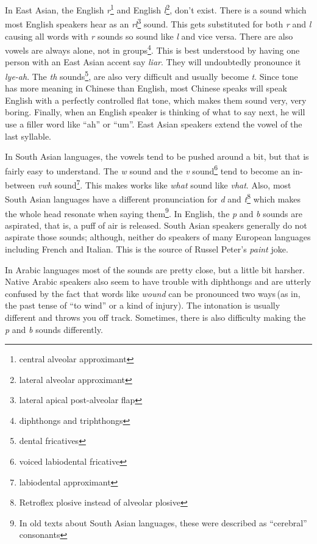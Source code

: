 \documentclass{book}
\begin{document}
In East Asian, the English \textsl{r}\footnote{central alveolar approximant} and English \textsl{l}\footnote{lateral alveolar approximant}, don't exist. There is a sound which most English speakers hear as an \textsl{rl}\footnote{lateral apical post-alveolar flap} sound. This gets substituted for both \textsl{r} and \textsl{l} causing all words with \textsl{r} sounds so sound like \textsl{l} and vice versa. There are also vowels are always alone, not in groups\footnote{diphthongs and triphthongs}. This is best understood by having one person with an East Asian accent say \textsl{liar}. They will undoubtedly pronounce it \textsl{lye-ah}. The \textsl{th} sounds\footnote{dental fricatives}, are also very difficult and usually become \textsl{t}. Since tone has more meaning in Chinese than English, most Chinese speaks will speak English with a perfectly controlled flat tone, which makes them sound very, very boring. Finally, when an English speaker is thinking of what to say next, he will use a filler word like ``ah'' or ``um''. East Asian speakers extend the vowel of the last syllable.

In South Asian languages, the vowels tend to be pushed around a bit, but that is fairly easy to understand. The \textsl{w} sound and the \textsl{v} sound\footnote{voiced labiodental fricative} tend to become an in-between \textsl{vwh} sound\footnote{labiodental approximant}. This makes works like \textsl{what} sound like \textsl{vhat}. Also, most South Asian languages have a different pronunciation for \textsl{d} and \textsl{t}\footnote{Retroflex plosive instead of alveolar plosive} which makes the whole head resonate when saying them\footnote{In old texts about South Asian languages, these were described as ``cerebral'' consonants}. In English, the \textsl{p} and \textsl{b} sounds are aspirated, that is, a puff of air is released. South Asian speakers generally do not aspirate those sounds; although, neither do speakers of many European languages including French and Italian. This is the source of Russel Peter's \textsl{paint} joke.

In Arabic languages most of the sounds are pretty close, but a little bit harsher. Native Arabic speakers also seem to have trouble with diphthongs and are utterly confused by the fact that words like \textsl{wound} can be pronounced two ways\,(as in, the past tense of ``to wind'' or a kind of injury). The intonation is usually different and throws you off track. Sometimes, there is also difficulty making the \textsl{p} and \textsl{b} sounds differently.
\end{document}
